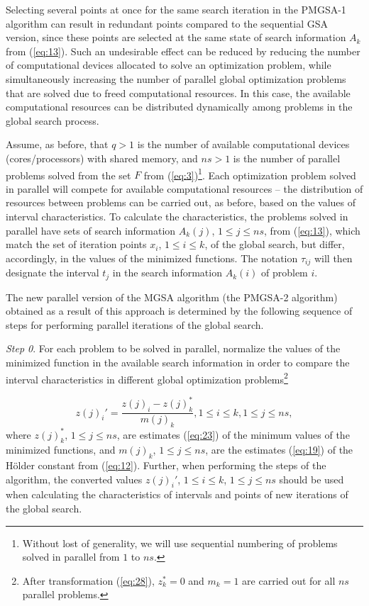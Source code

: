 \documentclass[review]{elsarticle}
\begin{document}
Selecting several points at once for the same search iteration in the PMGSA-1 algorithm can result in redundant points compared to the sequential GSA version, since these points are selected at the same state of search information $A_k$ from (\ref{eq:13}). Such an undesirable effect can be reduced by reducing the number of computational devices allocated to solve an optimization problem, while simultaneously increasing the number of parallel global optimization problems that are solved due to freed computational resources. In this case, the available computational resources can be distributed dynamically among problems in the global search process.

Assume, as before, that $q>1$ is the number of available computational devices (cores/processors) with shared memory, and $ns>1$ is the number of parallel problems solved from the set $F$ from (\ref{eq:3})\footnote{Without lost of generality, we will use sequential numbering of problems solved in parallel from $1$ to $ns$.}. Each optimization problem solved in parallel will compete for available computational resources -- the distribution of resources between problems can be carried out, as before, based on the values of interval characteristics. To calculate the characteristics, the problems solved in parallel have sets of search information $A_k(j)$, $1\leq j \leq ns$, from (\ref{eq:13}), which match the set of iteration points $x_i$, $1 \leq i \leq k$, of the global search, but differ, accordingly, in the values of the minimized functions. The notation $\tau_{ij}$ will then designate the interval $t_j$ in the search information $A_k(i)$ of problem $i$.

The new parallel version of the MGSA algorithm (the PMGSA-2 algorithm) obtained as a result of this approach is determined by the following sequence of steps for performing parallel iterations of the global search.

\textit{Step 0}. For each problem to be solved in parallel, normalize the values of the minimized function in the available search information in order to compare the interval characteristics in different global optimization problems\footnote{After transformation (\ref{eq:28}), $z_k^*=0$ and $m_k=1$ are carried out for all $ns$ parallel problems.}

\begin{equation}\label{eq:28}
z(j)_i'=\frac{z(j)_i-z(j)_k^*}{m(j)_k},1 \leq i \leq k,1 \leq j \leq ns,
\end{equation}
where $z(j)_k^*$, $1 \leq j \leq ns$, are estimates (\ref{eq:23}) of the minimum values of the minimized functions, and $m(j)_k$, $1 \leq j \leq ns$, are the estimates (\ref{eq:19}) of the H\"older constant from (\ref{eq:12}). Further, when performing the steps of the algorithm, the converted values $z(j)_i'$, $1 \leq i \leq k$, $1 \leq j \leq ns$ should be used when calculating the characteristics of intervals and points of new iterations of the global search.
\end{document}
